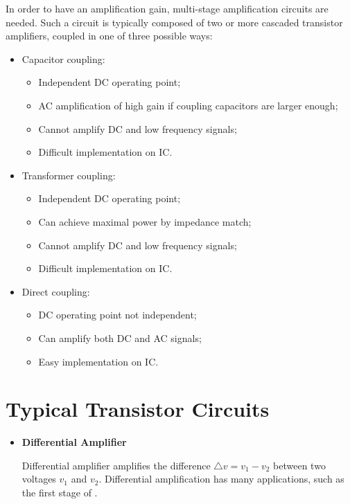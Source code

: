\begin{itemize}
In order to have an amplification gain, multi-stage amplification circuits
are needed. Such a circuit is typically composed of two or more cascaded
transistor amplifiers, coupled in one of three possible ways:
\begin{itemize}
\item Capacitor coupling:
	\begin{itemize}
	\item Independent DC operating point;
	\item AC amplification of high gain if coupling capacitors are
		larger enough;
	\item Cannot amplify DC and low frequency signals;
	\item Difficult implementation on IC.
	\end{itemize}

\item Transformer coupling:
	\begin{itemize}
	\item Independent DC operating point;
	\item Can achieve maximal power by impedance match;
	\item Cannot amplify DC and low frequency signals;
	\item Difficult implementation on IC.
	\end{itemize}

\item Direct coupling:
	\begin{itemize}
	\item DC operating point not independent;
	\item Can amplify both DC and AC signals;
	\item Easy implementation on IC.
	\end{itemize}

\end{itemize}


\section*{Typical Transistor Circuits}

\begin{itemize}

\item {\bf Differential Amplifier}

Differential amplifier amplifies the difference $\triangle v=v_1-v_2$ 
between two voltages $v_1$ and $v_2$. Differential amplification has 
many applications, such as the first stage of 
.


\end{itemize}
\end{itemize}
